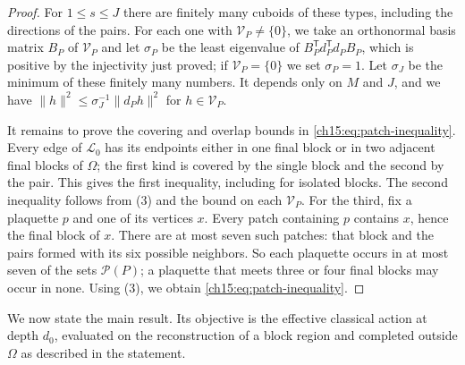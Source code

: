 \begin{proof}
For $1\le s\le J$ there are finitely many cuboids of these types, including the directions of the pairs. For each one with $\mathcal V_P\ne\{0\}$, we take an orthonormal basis matrix $B_P$ of $\mathcal V_P$ and let $\sigma_P$ be the least eigenvalue of $B_P^{\mathsf T}d_P^{\mathsf T}d_PB_P$, which is positive by the injectivity just proved; if $\mathcal V_P=\{0\}$ we set $\sigma_P=1$. Let $\sigma_J$ be the minimum of these finitely many numbers. It depends only on $M$ and $J$, and we have $\|h\|^2\le\sigma_J^{-1}\|d_Ph\|^2$ for $h\in\mathcal V_P$.

It remains to prove the covering and overlap bounds in \eqref{ch15:eq:patch-inequality}. Every edge of $\mathcal L_0$ has its endpoints either in one final block or in two adjacent final blocks of $\Omega$; the first kind is covered by the single block and the second by the pair. This gives the first inequality, including for isolated blocks. The second inequality follows from (3) and the bound on each $\mathcal V_P$. For the third, fix a plaquette $p$ and one of its vertices $x$. Every patch containing $p$ contains $x$, hence the final block of $x$. There are at most seven such patches: that block and the pairs formed with its six possible neighbors. So each plaquette occurs in at most seven of the sets $\mathcal P(P)$; a plaquette that meets three or four final blocks may occur in none. Using (3), we obtain \eqref{ch15:eq:patch-inequality}.
\end{proof}

We now state the main result. Its objective is the effective classical action at depth $d_0$, evaluated on the reconstruction of a block region and completed outside $\Omega$ as described in the statement.

